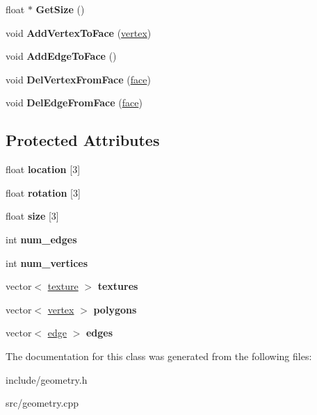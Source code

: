 \begin{DoxyCompactItemize}
float $\ast$ {\bfseries Get\+Size} ()
\item 
\mbox{\label{classface_a1d191169d815678ce8969b2174359d20}} 
void {\bfseries Add\+Vertex\+To\+Face} (\hyperlink{classvertex}{vertex})
\item 
\mbox{\label{classface_a075797e1980d676cddc1b96e881dbd89}} 
void {\bfseries Add\+Edge\+To\+Face} ()
\item 
\mbox{\label{classface_af06f838827ab57ca07b44d6470773410}} 
void {\bfseries Del\+Vertex\+From\+Face} (\hyperlink{classface}{face})
\item 
\mbox{\label{classface_ac04c01fc9775f80e4f051ebd12fa13e3}} 
void {\bfseries Del\+Edge\+From\+Face} (\hyperlink{classface}{face})
\end{DoxyCompactItemize}
\subsection*{Protected Attributes}
\begin{DoxyCompactItemize}
\item 
\mbox{\label{classface_a2314e1606f18e1646e3699d216972f85}} 
float {\bfseries location} \mbox{[}3\mbox{]}
\item 
\mbox{\label{classface_a985dcf85600ca0b8263140a494543cda}} 
float {\bfseries rotation} \mbox{[}3\mbox{]}
\item 
\mbox{\label{classface_a9d9ac2b120c2123e95acfd75e66a8950}} 
float {\bfseries size} \mbox{[}3\mbox{]}
\item 
\mbox{\label{classface_a59ed8b29c67536b39b5e7f43f674c721}} 
int {\bfseries num\+\_\+edges}
\item 
\mbox{\label{classface_abc378bcf2fb620c005f071c83c952fb5}} 
int {\bfseries num\+\_\+vertices}
\item 
\mbox{\label{classface_adf25ae0e541f2fa5e9fa27cdbf6a1cb5}} 
vector$<$ \hyperlink{classtexture}{texture} $>$ {\bfseries textures}
\item 
\mbox{\label{classface_a2bcf95c5c271ade955be8db5a3a9c9ba}} 
vector$<$ \hyperlink{classvertex}{vertex} $>$ {\bfseries polygons}
\item 
\mbox{\label{classface_a7558f66892269ccd614ebb3950336d41}} 
vector$<$ \hyperlink{classedge}{edge} $>$ {\bfseries edges}
\end{DoxyCompactItemize}


The documentation for this class was generated from the following files\+:\begin{DoxyCompactItemize}
\item 
include/geometry.\+h\item 
src/geometry.\+cpp\end{DoxyCompactItemize}
